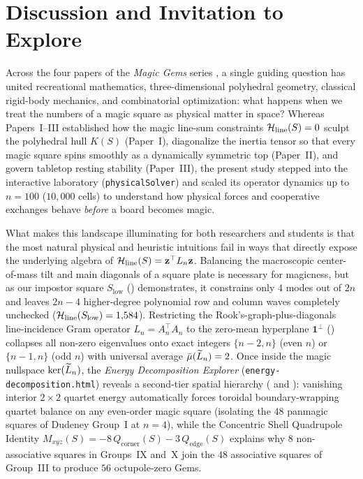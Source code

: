 \section{Discussion and Invitation to Explore}
\label{sec:discussion}

Across the four papers of the \emph{Magic Gems} series \cite{mathewson2026gems,mathewson2026moments,mathewson2026mechanics}, a single guiding question has united recreational mathematics, three-dimensional polyhedral geometry, classical rigid-body mechanics, and combinatorial optimization: what happens when we treat the numbers of a magic square as physical matter in space? Whereas Papers~I--III established how the magic line-sum constraints $\mathcal{H}_{\mathrm{line}}(S) = 0$ sculpt the polyhedral hull $K(S)$ (Paper~I), diagonalize the inertia tensor so that every magic square spins smoothly as a dynamically symmetric top (Paper~II), and govern tabletop resting stability (Paper~III), the present study stepped into the interactive laboratory (\texttt{physicalSolver}) and scaled its operator dynamics up to $n = 100$ ($10{,}000$ cells) to understand how physical forces and cooperative exchanges behave \emph{before} a board becomes magic.

What makes this landscape illuminating for both researchers and students is that the most natural physical and heuristic intuitions fail in ways that directly expose the underlying algebra of $\mathcal{H}_{\mathrm{line}}(S) = \mathbf{z}^\top L_n \mathbf{z}$. Balancing the macroscopic center-of-mass tilt and main diagonals of a square plate is necessary for magicness, but as our impostor square $S_{\mathrm{low}}$ () demonstrates, it constrains only $4$ modes out of $2n$ and leaves $2n-4$ higher-degree polynomial row and column waves completely unchecked ($\mathcal{H}_{\mathrm{line}}(S_{\mathrm{low}}) = 1{,}584$). Restricting the Rook's-graph-plus-diagonals line-incidence Gram operator $L_n = A_n^\top A_n$ \cite{godsil2001algebraic,brouwer2012spectra,loly2009magic} to the zero-mean hyperplane $\mathbf{1}^\perp$ () collapses all non-zero eigenvalues onto exact integers $\{n-2, n\}$ (even $n$) or $\{n-1, n\}$ (odd $n$) with universal average $\bar{\mu}(\widetilde{L}_n) = 2$. Once inside the magic nullspace $\ker(\widetilde{L}_n)$, the \emph{Energy Decomposition Explorer} (\texttt{energy-decomposition.html}) reveals a second-tier spatial hierarchy ( and ): vanishing interior $2\times 2$ quartet energy automatically forces toroidal boundary-wrapping quartet balance on any even-order magic square (isolating the $48$ panmagic squares of Dudeney Group~I at $n=4$), while the Concentric Shell Quadrupole Identity $M_{xyz}(S) = -8\,Q_{\mathrm{corner}}(S) - 3\,Q_{\mathrm{edge}}(S)$ explains why $8$ non-associative squares in Groups~IX and~X join the $48$ associative squares of Group~III to produce $56$ octupole-zero Gems.

